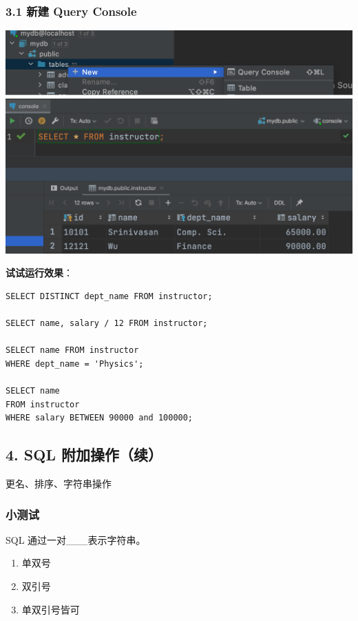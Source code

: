 \documentclass[aspectratio=169, 14pt]{beamer}
\begin{document}
\begin{frame}
    \frametitle{3.1 新建 Query Console}
    \includegraphics[height=.34\paperheight]{week4/console}  
    \pause
    \includegraphics[height=.5\paperheight]{week4/select}   

\end{frame}

\begin{frame}[fragile]
\textbf{试试运行效果}：

\begin{verbatim} 
SELECT DISTINCT dept_name FROM instructor;       

SELECT name, salary / 12 FROM instructor;

SELECT name FROM instructor
WHERE dept_name = 'Physics';

SELECT name
FROM instructor
WHERE salary BETWEEN 90000 and 100000;
\end{verbatim}      

\end{frame}

\begin{frame}
    \section{\textcolor{darkmidnightblue}{4. SQL 附加操作（续）}}  
更名、排序、\alert{字符串操作}
\end{frame}

\begin{frame}
    \frametitle{小测试}
{
    \renewcommand{\theenumi}{\Alph{enumi}}
    SQL 通过一对\_\_\_表示字符串。
    \begin{enumerate}
        \item 单双号
        \item 双引号
        \item 单双引号皆可
    \end{enumerate}
}        

\end{frame}
\end{document}

